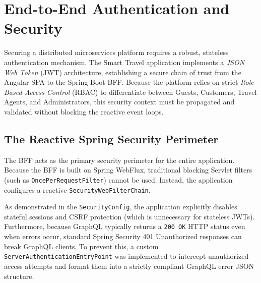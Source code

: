 \section{End-to-End Authentication and Security}
\label{sec:authentication_security}

Securing a distributed microservices platform requires a robust, stateless authentication mechanism. The Smart Travel application implements a \textit{JSON Web Token} (\gls{JWT}) architecture, establishing a secure chain of trust from the Angular \gls{SPA} to the Spring Boot \gls{BFF}. Because the platform relies on strict \textit{Role-Based Access Control} (\gls{RBAC}) to differentiate between Guests, Customers, Travel Agents, and Administrators, this security context must be propagated and validated without blocking the reactive event loops.

\subsection{The Reactive Spring Security Perimeter}

The \gls{BFF} acts as the primary security perimeter for the entire application. Because the BFF is built on Spring WebFlux, traditional blocking Servlet filters (such as \texttt{OncePerRequestFilter}) cannot be used. Instead, the application configures a reactive \texttt{SecurityWebFilterChain}.

As demonstrated in the \texttt{SecurityConfig}, the application explicitly disables stateful sessions and CSRF protection (which is unnecessary for stateless JWTs). Furthermore, because GraphQL typically returns a \texttt{200 OK} HTTP status even when errors occur, standard Spring Security 401 Unauthorized responses can break GraphQL clients. To prevent this, a custom \texttt{ServerAuthenticationEntryPoint} was implemented to intercept unauthorized access attempts and format them into a strictly compliant GraphQL error JSON structure.

